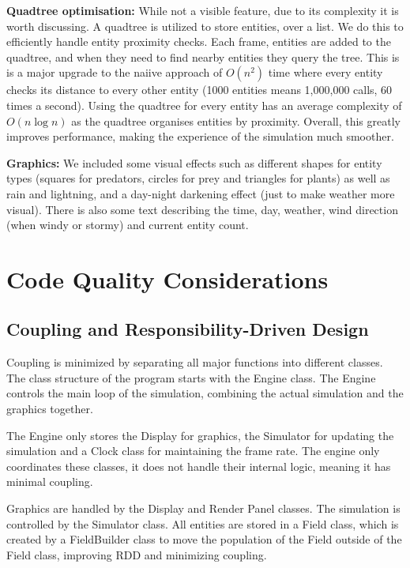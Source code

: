 \documentclass[10pt, a4paper]{scrartcl}
\begin{document}
\begin{multicols}{2}
        \noindent \textbf{Quadtree optimisation: } While not a visible feature, due to its complexity it is worth discussing. A quadtree is utilized to store entities, over a list. We do this to efficiently handle entity proximity checks. Each frame, entities are added to the quadtree, and when they need to find nearby entities they query the tree. This is is a major upgrade to the naiive approach of $O(n^2)$ time where every entity checks its distance to every other entity (1000 entities means 1,000,000 calls, 60 times a second). Using the quadtree for every entity has an average complexity of $O(n \log n)$ as the quadtree organises entities by proximity. Overall, this greatly improves performance, making the experience of the simulation much smoother.

        \noindent \textbf{Graphics: } We included some visual effects such as different shapes for entity types (squares for predators, circles for prey and triangles for plants) as well as rain and lightning, and a day-night darkening effect (just to make weather more visual). There is also some text describing the time, day, weather, wind direction (when windy or stormy) and current entity count.

        \section{Code Quality Considerations}

        \subsection{Coupling and Responsibility-Driven Design}
        Coupling is minimized by separating all major functions into different classes. The class structure of the program starts with the Engine class. The Engine controls the main loop of the simulation, combining the actual simulation and the graphics together.

        The Engine only stores the Display for graphics, the Simulator for updating the simulation and a Clock class for maintaining the frame rate. The engine only coordinates these classes, it does not handle their internal logic, meaning it has minimal coupling.

        Graphics are handled by the Display and Render Panel classes. The simulation is controlled by the Simulator class. All entities are stored in a Field class, which is created by a FieldBuilder class to move the population of the Field outside of the Field class, improving RDD and minimizing coupling.


\end{multicols}
\end{document}
